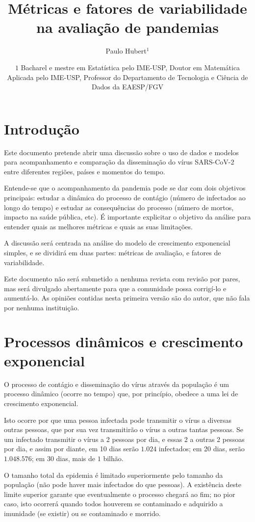 \documentclass[12pt]{extarticle}
\title{Métricas e fatores de variabilidade na avaliação de pandemias}
\author{Paulo Hubert$^1$}
\date{$1$ Bacharel e mestre em Estatística pelo IME-USP, Doutor em Matemática Aplicada pelo IME-USP, Professor do Departamento de Tecnologia e Ciência de Dados da EAESP/FGV}
\begin{document}
\maketitle

\section{Introdução}

Este documento pretende abrir uma discussão sobre o uso de dados e modelos para acompanhamento e comparação da disseminação do vírus SARS-CoV-2 entre diferentes regiões, países e momentos do tempo. 

Entende-se que o acompanhamento da pandemia pode se dar com dois objetivos principais: estudar a dinâmica do processo de contágio (número de infectados ao longo do tempo) e estudar as consequências do processo (número de mortos, impacto na saúde pública, etc). É importante explicitar o objetivo da análise para entender quais as melhores métricas e quais as suas limitações.

A discussão será centrada na análise do modelo de crescimento exponencial simples, e se dividirá em duas partes: métricas de avaliação, e fatores de variabilidade.

Este documento não será submetido a nenhuma revista com revisão por pares, mas será divulgado abertamente para que a comunidade possa corrigí-lo e aumentá-lo. As opiniões contidas nesta primeira versão são do autor, que não fala por nenhuma instituição.

\section{Processos dinâmicos e crescimento exponencial}

O processo de contágio e disseminação do vírus através da população é um processo dinâmico (ocorre no tempo) que, por princípio, obedece a uma lei de crescimento exponencial.

Isto ocorre por que uma pessoa infectada pode transmitir o vírus a diversas outras pessoas, que por sua vez transmitirão o vírus a outras tantas pessoas. Se um infectado transmitir o vírus a 2 pessoas por dia, e essas 2 a outras 2 pessoas por dia, e assim por diante, em 10 dias serão $1.024$ infectados; em 20 dias, serão $1.048.576$; em 30 dias, mais de $1$ bilhão.

O tamanho total da epidemia é limitado superiormente pelo tamanho da população (não pode haver mais infectados do que pessoas). A existência deste limite superior garante que eventualmente o processo chegará ao fim; no pior caso, isto ocorrerá quando todos houverem se contaminado e adquirido a imunidade (se existir) ou se contaminado e morrido.
\end{document}
